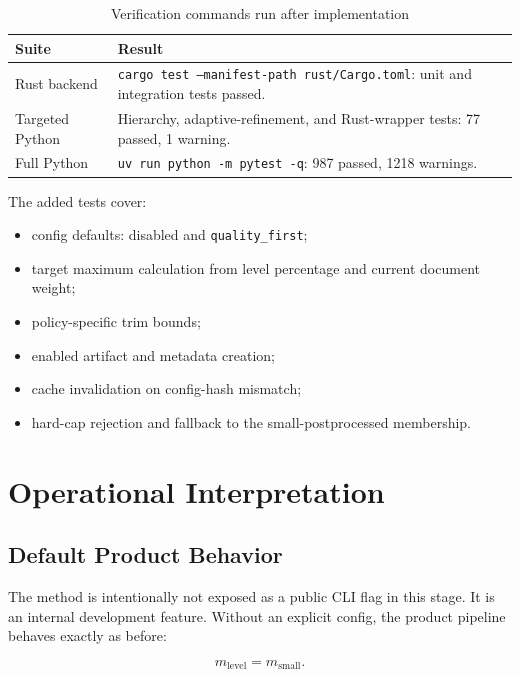 \documentclass[11pt,a4paper]{article}
\begin{document}
\begin{table}[h]
\centering
\caption{Verification commands run after implementation}
\begin{tabularx}{\textwidth}{p{}X}
\toprule
Suite & Result \\
\midrule
Rust backend
    & \texttt{cargo test --manifest-path rust/Cargo.toml}: unit and integration tests passed. \\
Targeted Python
    & Hierarchy, adaptive-refinement, and Rust-wrapper tests: 77 passed, 1 warning. \\
Full Python
    & \texttt{uv run python -m pytest -q}: 987 passed, 1218 warnings. \\
\bottomrule
\end{tabularx}
\end{table}

The added tests cover:

\begin{itemize}[nosep]
    \item config defaults: disabled and \texttt{quality\_first};
    \item target maximum calculation from level percentage and current document weight;
    \item policy-specific trim bounds;
    \item enabled artifact and metadata creation;
    \item cache invalidation on config-hash mismatch;
    \item hard-cap rejection and fallback to the small-postprocessed membership.
\end{itemize}

\section{Operational Interpretation}

\subsection{Default Product Behavior}

The method is intentionally not exposed as a public CLI flag in this stage.
It is an internal development feature. Without an explicit config, the product
pipeline behaves exactly as before:

\begin{equation}
    m_{\text{level}} = m_{\text{small}}.
\end{equation}
\end{document}
